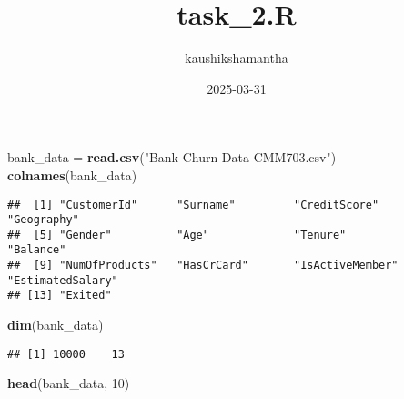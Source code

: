 \documentclass[
]{article}
\title{task\_2.R}
\author{kaushikshamantha}
\date{2025-03-31}
\newenvironment{Shaded}{\begin{snugshade}}{\end{snugshade}}
\newcommand{\DecValTok}[1]{\textcolor[rgb]{0.00,0.00,0.81}{#1}}
\newcommand{\FunctionTok}[1]{\textcolor[rgb]{0.13,0.29,0.53}{\textbf{#1}}}
\newcommand{\NormalTok}[1]{#1}
\newcommand{\OtherTok}[1]{\textcolor[rgb]{0.56,0.35,0.01}{#1}}
\newcommand{\StringTok}[1]{\textcolor[rgb]{0.31,0.60,0.02}{#1}}
\begin{document}
\maketitle

\begin{Shaded}
\begin{Highlighting}[]
\NormalTok{bank\_data }\OtherTok{=} \FunctionTok{read.csv}\NormalTok{(}\StringTok{"Bank Churn Data CMM703.csv"}\NormalTok{)}
\FunctionTok{colnames}\NormalTok{(bank\_data)}
\end{Highlighting}
\end{Shaded}

\begin{verbatim}
##  [1] "CustomerId"      "Surname"         "CreditScore"     "Geography"      
##  [5] "Gender"          "Age"             "Tenure"          "Balance"        
##  [9] "NumOfProducts"   "HasCrCard"       "IsActiveMember"  "EstimatedSalary"
## [13] "Exited"
\end{verbatim}

\begin{Shaded}
\begin{Highlighting}[]
\FunctionTok{dim}\NormalTok{(bank\_data)}
\end{Highlighting}
\end{Shaded}

\begin{verbatim}
## [1] 10000    13
\end{verbatim}

\begin{Shaded}
\begin{Highlighting}[]
\FunctionTok{head}\NormalTok{(bank\_data, }\DecValTok{10}\NormalTok{)}
\end{Highlighting}
\end{Shaded}
\end{document}
